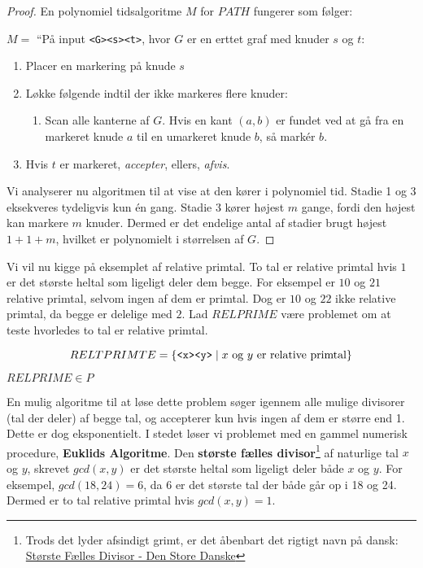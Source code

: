 \begin{proof}
	En polynomiel tidsalgoritme $M$ for $PATH$ fungerer som følger:

	$M =$ ``På input \texttt{<G><s><t>}, hvor $G$ er en erttet graf med knuder $s$ og $t$:
	\begin{enumerate}
		\item Placer en markering på knude $s$
		\item Løkke følgende indtil der ikke markeres flere knuder:
		      \begin{enumerate}
			      \item Scan alle kanterne af $G$. Hvis en kant $(a,b)$ er fundet ved at gå fra en markeret knude $a$ til en umarkeret knude $b$, så markér $b$.
		      \end{enumerate}
		\item Hvis $t$ er markeret, \textit{accepter}, ellers, \textit{afvis}.
	\end{enumerate}

	Vi analyserer nu algoritmen til at vise at den kører i polynomiel tid. Stadie 1 og 3 eksekveres tydeligvis kun én gang. Stadie 3 kører højest $m$ gange, fordi den højest kan markere $m$ knuder. Dermed er det endelige antal af stadier brugt højest $1 + 1 + m$, hvilket er polynomielt i størrelsen af $G$.
\end{proof}

Vi vil nu kigge på eksemplet af relative primtal. To tal er relative primtal hvis $1$ er det største heltal som ligeligt deler dem begge. For eksempel er $10$ og $21$ relative primtal, selvom ingen af dem er primtal. Dog er $10$ og $22$ ikke relative primtal, da begge er delelige med $2$. Lad $RELPRIME$ være problemet om at teste hvorledes to tal er relative primtal.

\begin{equation*}
	RELTPRIMTE = \{\text{\texttt{<x><y>}} \mid x \text{ og } y \text{ er relative primtal}\}
\end{equation*}

\begin{theorem}
	$RELPRIME \in P$
\end{theorem}

En mulig algoritme til at løse dette problem søger igennem alle mulige divisorer (tal der deler) af begge tal, og accepterer kun hvis ingen af dem er større end 1. Dette er dog eksponentielt. I stedet løser vi problemet med en gammel numerisk procedure, \textbf{Euklids Algoritme}. Den \textbf{største fælles divisor}\footnote{Trods det lyder afsindigt grimt, er det åbenbart det rigtigt navn på dansk: \href{https://denstoredanske.lex.dk/st\%C3\%B8rste_f\%C3\%A6lles_divisor}{Største Fælles Divisor - Den Store Danske}} af naturlige tal $x$ og $y$, skrevet $gcd(x,y)$ er det største heltal som ligeligt deler både $x$ og $y$. For eksempel, $gcd(18,24) = 6$, da $6$ er det største tal der både går op i 18 og 24. Dermed er to tal relative primtal hvis $gcd(x,y) = 1$.

